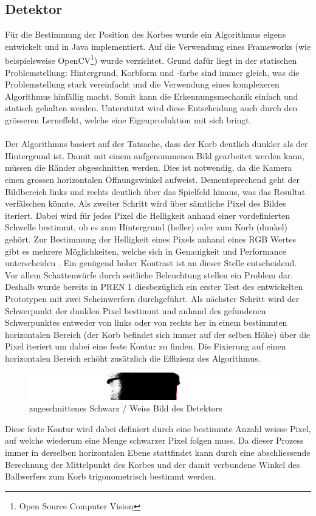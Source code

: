 \subsection{Detektor}
	Für die Bestimmung der Position des Korbes wurde ein Algorithmus 
	eigens entwickelt und in Java implementiert. Auf die Verwendung eines 
	Frameworks (wie beispielsweise OpenCV\footnote{Open Source Computer Vision}) wurde verzichtet. Grund dafür 
	liegt in der statischen Problemstellung: Hintergrund, Korbform und -farbe 
	sind immer gleich, was die Problemstellung stark vereinfacht und die Verwendung eines komplexeren Algorithmus hinfällig macht. Somit kann die Erkennungsmechanik einfach und statisch gehalten werden. Unterstützt wird diese Entscheidung auch durch den grösseren Lerneffekt, welche eine Eigenproduktion mit sich bringt. \\
	\\
	Der Algorithmus 
	basiert auf der Tatsache, dass der Korb deutlich dunkler als der 
	Hintergrund ist. Damit mit einem aufgenommenen Bild gearbeitet werden kann, 
	müssen die Ränder abgeschnitten werden. Dies ist notwendig, da die Kamera einen 
	grossen horizontalen Öffnungswinkel aufweist. Dementsprechend geht der 
	Bildbereich links und rechts deutlich über das Spielfeld 
	hinaus, was das Resultat verfälschen könnte. Als zweiter Schritt wird 
	über sämtliche Pixel des Bildes iteriert. Dabei wird für jedes Pixel die 
	Helligkeit anhand einer vordefinierten Schwelle bestimmt, ob es zum 
	Hintergrund (heller) oder zum Korb (dunkel) gehört. Zur Bestimmung der Helligkeit eines Pixels anhand eines RGB Wertes gibt es mehrere Möglichkeiten, welche sich in Genauigkeit und Performance unterscheiden \cite{S:RGB}. Ein genügend hoher 
	Kontrast ist an dieser Stelle entscheidend. Vor allem Schattenwürfe durch 
	seitliche Beleuchtung stellen ein Problem dar. Deshalb wurde bereits in PREN 1 diesbezüglich 
	ein erster Test des entwickelten Prototypen mit zwei Scheinwerfern 
	durchgeführt. Als nächster Schritt 
	wird der Schwerpunkt der dunklen Pixel bestimmt und anhand des gefundenen 
	Schwerpunktes entweder von links oder von rechts her in einem bestimmten 
	horizontalen Bereich (der Korb befindet sich immer auf der selben Höhe)
	über die Pixel iteriert um dabei eine feste Kontur zu finden. Die Fixierung auf einen horizontalen Bereich erhöht zusätzlich die Effizienz des Algorithmus. 
	
	\begin{figure}[h!]
		\includegraphics[width=1 \textwidth,clip] 
		{Enddokumentation/Bilder/EditedPicture.jpg}
		\centering
		\caption{zugeschnittenes Schwarz / Weiss Bild des Detektors}
		\label{abb:editedPicture}
	\end{figure}
	
	Diese feste 
	Kontur wird dabei definiert durch eine bestimmte Anzahl weisse Pixel, auf 
	welche wiederum eine Menge schwarzer Pixel folgen muss. Da dieser Prozess 
	immer in derselben horizontalen Ebene stattfindet kann durch eine 
	abschliessende Berechnung der Mittelpunkt des Korbes und der damit 
	verbundene Winkel des Ballwerfers zum Korb trigonometrisch bestimmt werden.
